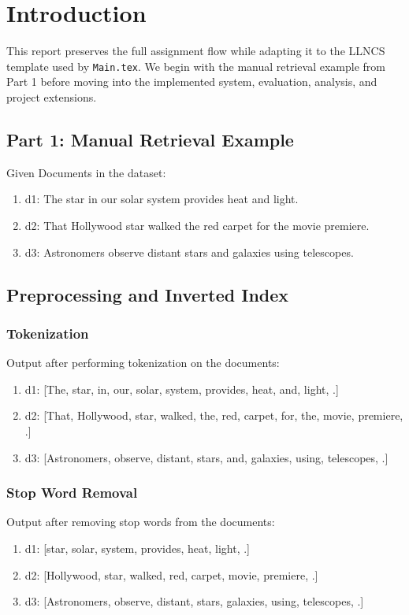 \section{Introduction}\label{sec:intro}

This report preserves the full assignment flow while adapting it to the LLNCS template used by \texttt{Main.tex}. We begin with the manual retrieval example from Part 1 before moving into the implemented system, evaluation, analysis, and project extensions.

\subsection{Part 1: Manual Retrieval Example}
Given Documents in the dataset:
\begin{enumerate}
    \item d1: The star in our solar system provides heat and light.
    \item d2: That Hollywood star walked the red carpet for the movie premiere.
    \item d3: Astronomers observe distant stars and galaxies using telescopes.
\end{enumerate}

\subsection{Preprocessing and Inverted Index}
\subsubsection{Tokenization}
Output after performing tokenization on the documents:
\begin{enumerate}
    \item d1: [The, star, in, our, solar, system, provides, heat, and, light, .]
    \item d2: [That, Hollywood, star, walked, the, red, carpet, for, the, movie, premiere, .]
    \item d3: [Astronomers, observe, distant, stars, and, galaxies, using, telescopes, .]
\end{enumerate}

\subsubsection{Stop Word Removal}
Output after removing stop words from the documents:
\begin{enumerate}
    \item d1: [star, solar, system, provides, heat, light, .]
    \item d2: [Hollywood, star, walked, red, carpet, movie, premiere, .]
    \item d3: [Astronomers, observe, distant, stars, galaxies, using, telescopes, .]
\end{enumerate}


